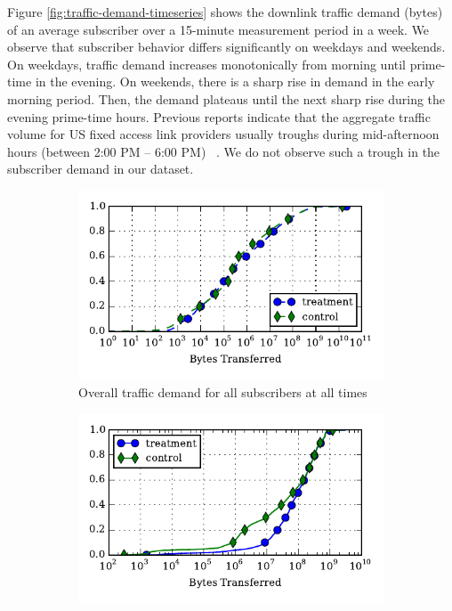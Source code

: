 Figure \ref{fig:traffic-demand-timeseries} shows the downlink traffic demand (bytes)
of an average subscriber over a 15-minute measurement period in a week.
We observe that subscriber behavior differs
significantly on weekdays and weekends. On weekdays, traffic demand 
increases monotonically from morning until prime-time in the evening. On 
weekends, there is a sharp rise in demand in the early morning period. Then, the
demand plateaus until the next sharp rise during the evening prime-time hours.
Previous reports indicate that the aggregate traffic volume for US fixed access
link providers usually troughs during mid-afternoon hours (between 2:00 PM -- 6:00 PM)
~\cite{sandvine20141h}. We do not observe such a trough in the subscriber 
demand in our dataset.

\begin{figure}[t]
\begin{minipage}{1\linewidth}
\centering
%
\begin{subfigure}[b]{1\linewidth}
\includegraphics[width=\linewidth]{figures/cdf-all-bytes.pdf}
               \caption{Overall traffic demand for all subscribers at all times\label{fig:CDF-data-rate}}
\end{subfigure}
%
\begin{subfigure}[b]{1\linewidth}
\includegraphics[width=\linewidth]{figures/cdf-per-device-perc95.pdf}

\end{subfigure}
\end{minipage}
\end{figure}
